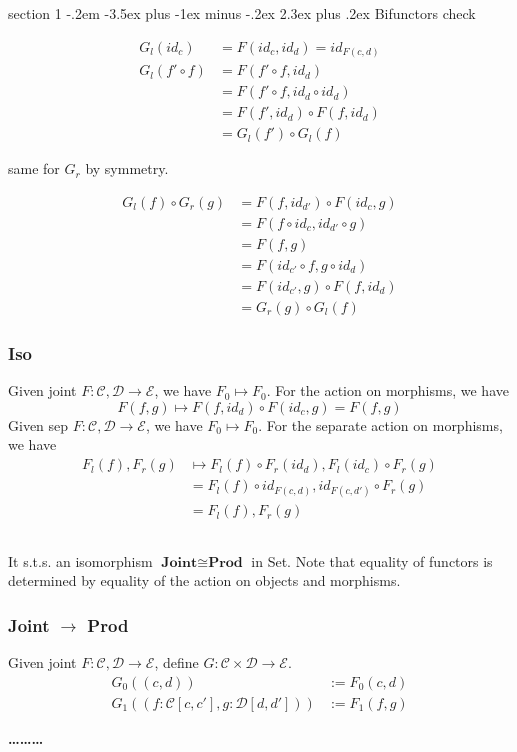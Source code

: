 \documentclass[12pt]{article}
\makeatletter
\theoremstyle{definition}
\newenvironment{problem}{\@startsection
       {section}
       {1}
       {-.2em}
       {-3.5ex plus -1ex minus -.2ex}
       {2.3ex plus .2ex}
       {\pagebreak[3]%
       \large\bf\noindent{Problem }
       }
       }
       {%
       \begin{center}\large\bf \ldots\ldots\ldots\end{center}}
\newcommand{\cat}{\mathcal}
\makeatother
\begin{document}
\begin{problem}{Bifunctors}
check

\begin{align*}
    G_l(id_c) &= F(id_c,id_d) = id_{F(c,d)}\\
    G_l(f' \circ f) &= F(f' \circ f,id_d)\\
    &= F(f' \circ f,id_d \circ id_d)\\
    &= F(f',id_d) \circ F(f,id_d)\\
    &= G_l (f') \circ G_l(f)
\end{align*}

same for $G_r$ by symmetry.

\begin{align*}
    G_l(f) \circ G_r(g) &= F(f,id_{d'}) \circ F(id_c,g)\\
    &=F(f \circ id_c, id_{d'} \circ g)\\
    &=F(f,g)\\
    &=F(id_{c'}\circ f, g \circ id_d)\\
    &=F(id_{c'},g) \circ F(f,id_d)\\
    &=G_r(g) \circ G_l(f)
\end{align*}

\subsubsection*{Iso}

Given joint $F : \cat C, \cat D \to \cat E$, we have $F_0 \mapsto F_0$. For the action on morphisms, we have 
\[
  F(f,g) \mapsto F(f,id_d) \circ F(id_c,g) = F(f,g)
\]
Given sep $F : \cat C, \cat D \to \cat E$, we have $F_0 \mapsto F_0$. For the separate action on morphisms, we have
\begin{align*}
    F_l(f),F_r(g)  &\mapsto F_l(f) \circ F_r(id_d), F_l(id_c) \circ F_r(g) \\
    &= F_l(f) \circ id_{F(c,d)},  id_{F(c,d')} \circ F_r(g)\\
    &= F_l(f), F_r(g)
\end{align*}


\subsection{}
It s.t.s. an isomorphism $\textbf{Joint} \cong \textbf{Prod}$ in Set. Note that equality of functors is determined by equality of the action on objects and morphisms.
\subsubsection*{Joint $\to$ Prod}
Given joint $F : \cat C,\cat D \to \cat E$, define $G : \cat C \times \cat D \to \cat E$.
\begin{align*}
    G_0((c,d)) &:= F_0(c,d)\\
    G_1((f : \cat C[c,c'],g : \cat D[d,d'])) & := F_1(f,g)
\end{align*}


\end{problem}
\end{document}
